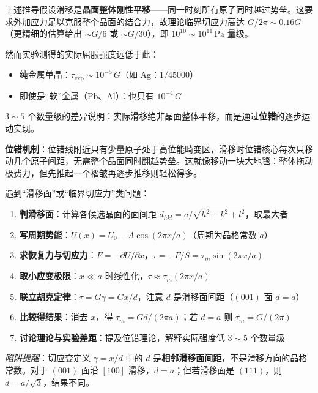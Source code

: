 \begin{insightbox}
上述推导假设滑移是\textbf{晶面整体刚性平移}——同一时刻所有原子同时越过势垒。这要求外加应力足以克服整个晶面的结合力，故理论临界切应力高达 $G/2\pi\sim 0.16G$（更精细的估算给出 $\sim G/6$ 或 $\sim G/30$），即 $10^{10}\sim 10^{11}\,\mathrm{Pa}$ 量级。

然而实验测得的实际屈服强度远低于此：
\begin{itemize}
    \item 纯金属单晶：$\tau_{\mathrm{exp}}\sim 10^{-5}\,G$（如 Ag：$1/45000$）
    \item 即使是``软''金属（Pb、Al）：也只有 $10^{-4}\,G$
\end{itemize}

$3\sim 5$ 个数量级的差异说明：实际滑移绝非晶面整体平移，而是通过\textbf{位错}的逐步运动实现。

\textbf{位错机制}：位错线附近只有少量原子处于高位能畸变区，滑移时位错核心每次只移动几个原子间距，无需整个晶面同时翻越势垒。这就像移动一块大地毯：整体拖动极费力，但先推起一个褶皱再逐步推移则轻松得多。
\end{insightbox}

\begin{thinkbox}
遇到``滑移面''或``临界切应力''类问题：
\begin{enumerate}
    \item \textbf{判滑移面}：计算各候选晶面的面间距 $d_{hkl}=a/\sqrt{h^2+k^2+l^2}$，取最大者
    \item \textbf{写周期势能}：$U(x)=U_0-A\cos(2\pi x/a)$（周期为晶格常数 $a$）
    \item \textbf{求恢复力与切应力}：$F=-\partial U/\partial x$，$\tau=-F/S=\tau_m\sin(2\pi x/a)$
    \item \textbf{取小应变极限}：$x\ll a$ 时线性化，$\tau\approx\tau_m(2\pi x/a)$
    \item \textbf{联立胡克定律}：$\tau=G\gamma=Gx/d$，注意 $d$ 是滑移面间距（$(001)$ 面 $d=a$）
    \item \textbf{比较得结果}：消去 $x$，得 $\tau_m=Gd/(2\pi a)$；若 $d=a$ 则 $\tau_m=G/(2\pi)$
    \item \textbf{讨论理论与实验差距}：提及位错理论，解释实际强度低 $3\sim 5$ 个数量级
\end{enumerate}
\textit{陷阱提醒}：切应变定义 $\gamma=x/d$ 中的 $d$ 是\textbf{相邻滑移面间距}，不是滑移方向的晶格常数。对于 $(001)$ 面沿 $[100]$ 滑移，$d=a$；但若滑移面是 $(111)$，则 $d=a/\sqrt{3}$，结果不同。
\end{thinkbox}
